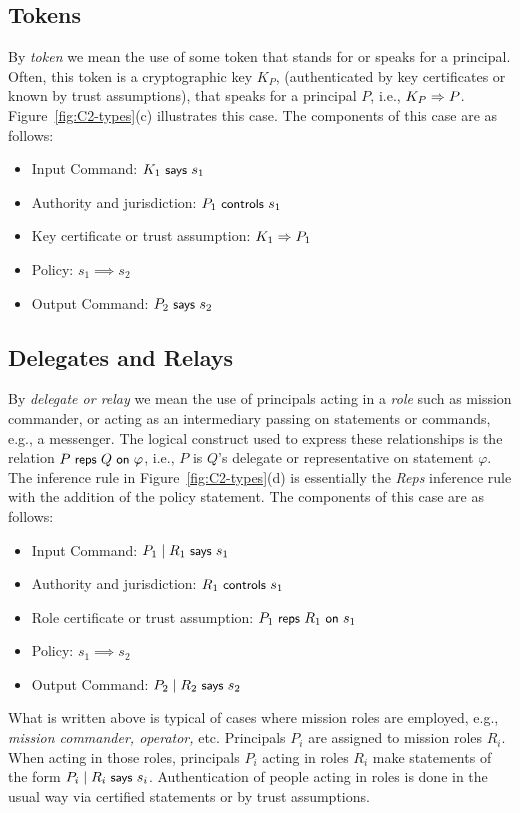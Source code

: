 \subsection{Tokens}
\label{sec:tokens}

By \emph{token} we mean the use of some token that stands for or
speaks for a principal. Often, this token is a cryptographic key
$K_P$, (authenticated by key certificates or known by trust
assumptions), that speaks for a principal $P$, i.e., $K_P \Rightarrow
P$. Figure~\ref{fig:C2-types}(c) illustrates this case. The components
of this case are as follows:
\begin{itemize}
\item Input Command: $K_1 \text{\small\textsf{ says }} s_1$
\item Authority and jurisdiction: $P_1 \text{\small\textsf{ controls }} s_1$
\item Key certificate or trust assumption: $K_1 \Rightarrow P_1$
\item Policy: $s_1 \implies s_2$
\item Output Command: $P_2 \text{\small\textsf{ says }} s_2$
\end{itemize}


\subsection{Delegates and Relays}
\label{sec:delegates-relays}

By \emph{delegate or relay} we mean the use of principals acting in a
\emph{role} such as mission commander, or acting as an intermediary
passing on statements or commands, e.g., a messenger. The logical
construct used to express these relationships is the relation
${P} \text{\small\textsf{ reps }}{Q}{\text{\small\textsf{ on }}}{\varphi}$, i.e., $P$ is $Q$'s delegate or representative
on statement $\varphi$. The inference rule in
Figure~\ref{fig:C2-types}(d) is essentially the \emph{Reps} inference
rule with the addition of the policy statement. The components of this
case are as follows:
\begin{itemize}
\item Input Command: $P_1 \;|\; R_1 \text{\small\textsf{ says }} s_1$
\item Authority and jurisdiction: $R_1 \text{\small\textsf{ controls }} s_1$
\item Role certificate or trust assumption: ${P_1} \text{\small\textsf{ reps }}{R_1}{\text{\small\textsf{ on }}}{s_1}$
\item Policy: $s_1 \implies s_2$
\item Output Command: $P_2 \;|\; R_2 \text{\small\textsf{ says }} s_2$
\end{itemize}

What is written above is typical of cases where mission roles are
employed, e.g., \emph{mission commander, operator,} etc. Principals
$P_i$ are assigned to mission roles $R_i$. When acting in those roles,
principals $P_i$ acting in roles $R_i$ make statements of the form
$P_i \;|\; R_i \text{\small\textsf{ says }} s_i$. Authentication of people acting in roles
is done in the usual way via certified statements or by trust
assumptions.

